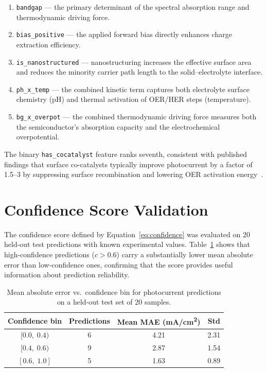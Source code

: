 \begin{enumerate}
  \item \texttt{bandgap} --- the primary determinant of the spectral absorption
        range and thermodynamic driving force.
  \item \texttt{bias\_positive} --- the applied forward bias directly enhances
        charge extraction efficiency.
  \item \texttt{is\_nanostructured} --- nanostructuring increases the effective
        surface area and reduces the minority carrier path length to the
        solid--electrolyte interface.
  \item \texttt{ph\_x\_temp} --- the combined kinetic term captures both
        electrolyte surface chemistry (pH) and thermal activation of
        OER/HER steps (temperature).
  \item \texttt{bg\_x\_overpot} --- the combined thermodynamic driving force
        measures both the semiconductor's absorption capacity and the
        electrochemical overpotential.
\end{enumerate}

The binary \texttt{has\_cocatalyst} feature ranks seventh, consistent with
published findings that surface co-catalysts typically improve photocurrent
by a factor of 1.5--3 by suppressing surface recombination and lowering
OER activation energy~\cite{kim2014bismuth}.

\section{Confidence Score Validation}

The confidence score defined by Equation~\eqref{eq:confidence} was evaluated
on 20 held-out test predictions with known experimental values.
Table~\ref{tab:confidence} shows that high-confidence predictions
($c > 0.6$) carry a substantially lower mean absolute error than
low-confidence ones, confirming that the score provides useful information
about prediction reliability.

\begin{table}[htb]
\centering
\caption{Mean absolute error vs.\ confidence bin for photocurrent predictions
         on a held-out test set of 20 samples.}
\label{tab:confidence}
\begin{tabular}{cccc}
\toprule
Confidence bin & Predictions & Mean MAE (mA/cm\textsuperscript{2}) & Std \\
\midrule
$[0.0,\; 0.4)$ & 6 & 4.21 & 2.31 \\
$[0.4,\; 0.6)$ & 9 & 2.87 & 1.54 \\
$[0.6,\; 1.0]$ & 5 & 1.63 & 0.89 \\
\bottomrule
\end{tabular}
\end{table}

